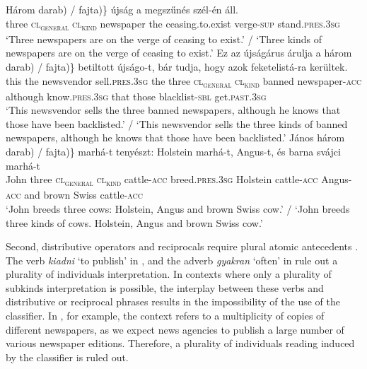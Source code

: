 \documentclass[output=paper]{langscibook}
\begin{document}
\ea \label{schv-nem:ex:10}
\gll Három \minsp{\{(*} darab) / \minsp{(} fajta)\} újság a megszűnés szél-én áll. \\
three {} \textsc{cl\textsubscript{general}} {} {} \textsc{cl\textsubscript{kind}} newspaper the ceasing.to.exist verge-\textsc{sup} stand.\textsc{pres}.\textsc{3sg}\\
\glt `Three newspapers are on the verge of ceasing to exist.' / `Three kinds of newspapers are on the verge of ceasing to exist.'
\ex \label{schv-nem:ex:11}
\gll Ez az újságárus árulja a három \minsp{\{(*} darab) / \minsp{(} fajta)\}  betiltott újságo-t, bár tudja, hogy azok feketelistá-ra kerültek. \\
this the newsvendor sell.\textsc{pres}.\textsc{3sg}  the  three  {} \textsc{cl\textsubscript{general}} {} {} \textsc{cl\textsubscript{kind}} banned newspaper-\textsc{acc} although know.\textsc{pres}.\textsc{3sg} that those blacklist-\textsc{sbl} get.\textsc{past}.\textsc{3sg}\\
\glt `This newsvendor sells the three banned newspapers, although he knows that those have been backlisted.' / `This newsvendor sells the three kinds of banned newspapers, although he knows that those have been backlisted.'
\ex \label{schv-nem:ex:12}
\gll János három \minsp{\{(*} darab) / \minsp{(} fajta)\} marhá-t tenyészt: Holstein marhá-t, Angus-t, és barna svájci marhá-t \\
 John three {} \textsc{cl\textsubscript{general}} {} {} \textsc{cl\textsubscript{kind}} cattle-\textsc{acc} breed.\textsc{pres}.\textsc{3sg}  Holstein cattle-\textsc{acc} Angus-\textsc{acc} and brown Swiss cattle-\textsc{acc} \\
\glt `John breeds three cows: Holstein, Angus and brown Swiss cow.' / `John breeds three kinds of cows. Holstein, Angus and brown Swiss cow.'
\z


\noindent Second, distributive operators and reciprocals require plural atomic antecedents \citep{link-83, rotstein-09, schwarzschild-11, schvarcz-14}. The verb \textit{kiadni} `to publish' in , and the adverb \textit{gyakran} `often' in  rule out a plurality of individuals interpretation.  In contexts where only  a plurality of subkinds interpretation is possible, the interplay between these verbs and distributive or reciprocal phrases results in the impossibility of the use of the classifier.  In , for example, the context refers to a multiplicity of copies of different newspapers, as we expect news agencies to publish a large number of  various newspaper editions. Therefore, a plurality of individuals reading induced by the classifier is ruled out.
\end{document}
